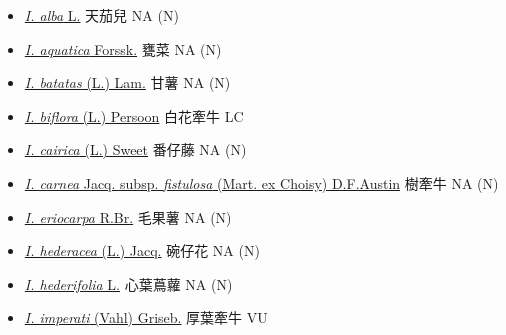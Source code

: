 \begin{itemize}
  \begin{itemize}
        \item[] \href{http://www.theplantlist.org/tpl1.1/search?q=Ipomoea+alba}{\textit{I. alba} L.}   天茄兒   NA (N)
        \item[] \href{http://www.theplantlist.org/tpl1.1/search?q=Ipomoea+aquatica}{\textit{I. aquatica} Forssk.}   甕菜   NA (N)
        \item[] \href{http://www.theplantlist.org/tpl1.1/search?q=Ipomoea+batatas}{\textit{I. batatas} (L.) Lam.}   甘薯   NA (N)
        \item[] \href{http://www.theplantlist.org/tpl1.1/search?q=Ipomoea+biflora}{\textit{I. biflora} (L.) Persoon}   白花牽牛   LC
        \item[] \href{http://www.theplantlist.org/tpl1.1/search?q=Ipomoea+cairica}{\textit{I. cairica} (L.) Sweet}   番仔藤   NA (N)
        \item[] \href{http://www.theplantlist.org/tpl1.1/search?q=Ipomoea+carnea+subsp.+fistulosa}{\textit{I. carnea} Jacq. subsp. \textit{fistulosa} (Mart. ex Choisy) D.F.Austin}   樹牽牛   NA (N)
        \item[] \href{http://www.theplantlist.org/tpl1.1/search?q=Ipomoea+eriocarpa}{\textit{I. eriocarpa} R.Br.}   毛果薯   NA (N)
        \item[] \href{http://www.theplantlist.org/tpl1.1/search?q=Ipomoea+hederacea}{\textit{I. hederacea} (L.) Jacq.}   碗仔花   NA (N)
        \item[] \href{http://www.theplantlist.org/tpl1.1/search?q=Ipomoea+hederifolia}{\textit{I. hederifolia} L.}   心葉蔦蘿   NA (N)
        \item[] \href{http://www.theplantlist.org/tpl1.1/search?q=Ipomoea+imperati}{\textit{I. imperati} (Vahl) Griseb.}   厚葉牽牛   VU

\end{itemize}
\end{itemize}
